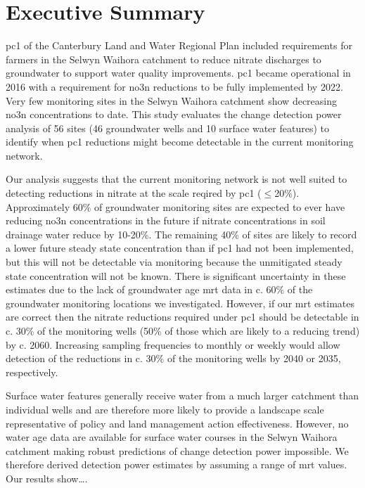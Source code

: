 \usepackage{glossaries}%

\section*{Executive Summary} \label{exsum} %


\gls{pc1} of the Canterbury Land and Water Regional Plan included requirements for farmers in the Selwyn Waihora catchment to reduce nitrate discharges to groundwater to support water quality improvements.
\gls{pc1} became operational in 2016 with a requirement for \gls{no3n} reductions to be fully implemented by 2022.
Very few monitoring sites in the Selwyn Waihora catchment show decreasing \gls{no3n} concentrations to date.
This study evaluates the change detection power analysis of 56 sites (46 groundwater wells and 10 surface water features) to identify when \gls{pc1} reductions might become detectable in the current monitoring network.

Our analysis suggests that the current monitoring network is not well suited to detecting reductions in nitrate at the scale reqired by \gls{pc1} ($\leq$20\%).
Approximately 60\% of groundwater monitoring sites are expected to ever have reducing \gls{no3n} concentrations in the future if nitrate concentrations in soil drainage water reduce by 10-20\%.
The remaining 40\% of sites are likely to record a lower future steady state concentration than if \gls{pc1} had not been implemented, but this will not be detectable via monitoring because the unmitigated steady state concentration will not be known.
There is significant uncertainty in these estimates due to the lack of groundwater age \gls{mrt} data in c. 60\% of the groundwater monitoring locations we investigated.
However, if our \gls{mrt} estimates are correct then the nitrate reductions required under \gls{pc1} should be detectable in c. 30\% of the monitoring wells (50\% of those which are likely to a reducing trend) by c. 2060.
Increasing sampling frequencies to monthly or weekly would allow detection of the reductions in c. 30\% of the monitoring wells by 2040 or 2035, respectively.

Surface water features generally receive water from a much larger catchment than individual wells and are therefore more likely to provide a landscape scale representative of policy and land management action effectiveness. However, no water age data are available for surface water courses in the Selwyn Waihora catchment making robust predictions of change detection power impossible.
We therefore derived detection power estimates by assuming a range of \gls{mrt} values.
Our results show…. %


